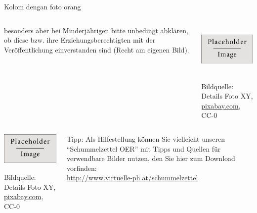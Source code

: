 \documentclass[main.tex]{subfiles}
\begin{document}
\begin{frame}{Kolom dengan foto orang}
	\begin{columns}
		\begin{column}{5cm}
			\small besonders aber bei Minderjährigen bitte unbedingt abklären, ob diese bzw. ihre Erziehungsberechtigten mit der Veröffentlichung einverstanden sind (Recht am eigenen Bild).
		\end{column}
		\begin{column}{5cm}
			\begin{center}
				\includegraphics[height=2.5cm]{figures/placeholder}

				{\tiny \textcolor{digiPH_darkorange}{Bildquelle: Details Foto XY, \url{pixabay.com}, CC-0}}
			\end{center}
		\end{column}
	\end{columns}
	\begin{columns}
		\begin{column}{5cm}
			\begin{center}
				\includegraphics[width=5cm]{figures/placeholder}

				{\tiny \textcolor{digiPH_darkorange}{Bildquelle: Details Foto XY, \url{pixabay.com}, CC-0}}
			\end{center}
		\end{column}
		\begin{column}{5cm}
			\begin{block}{\small Tipp:}
				\scriptsize
				Als Hilfestellung können Sie vielleicht unseren \enquote{Schummelzettel OER} mit Tipps und Quellen für verwendbare Bilder nutzen, den Sie hier zum Download vorfinden:\\
				\url{http://www.virtuelle-ph.at/schummelzettel}
			\end{block}
		\end{column}
	\end{columns}
\end{frame}
\end{document}
